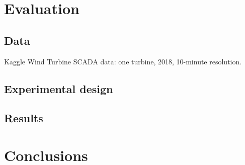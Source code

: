 \documentclass[11pt]{article}
\begin{document}
\section{Evaluation}
\subsection{Data}
Kaggle Wind Turbine SCADA data: one turbine, 2018, 10-minute resolution.

\subsection{Experimental design}

\subsection{Results}

\section{Conclusions}



\end{document}
